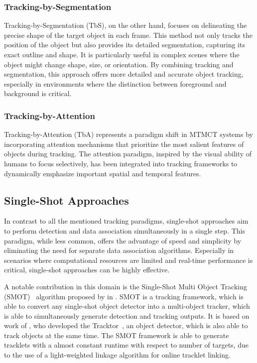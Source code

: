 \subsubsection{Tracking-by-Segmentation}\label{subsubsec:tracking-by-segmentation}
Tracking-by-Segmentation (TbS), on the other hand, focuses on delineating the precise shape of the target object in each frame. This method not only tracks the position of the object but also provides its detailed segmentation, capturing its exact outline and shape. It is particularly useful in complex scenes where the object might change shape, size, or orientation. By combining tracking and segmentation, this approach offers more detailed and accurate object tracking, especially in environments where the distinction between foreground and background is critical.

\subsubsection{Tracking-by-Attention}\label{subsubsec:tracking_by_attention}Tracking-by-Attention (TbA) represents a paradigm shift in MTMCT systems by incorporating attention mechanisms that prioritize the most salient features of objects during tracking. The attention paradigm, inspired by the visual ability of humans to focus selectively, has been integrated into tracking frameworks to dynamically emphasize important spatial and temporal features.

\subsection{Single-Shot Approaches}\label{subsec:single-shot_approaches}
In contrast to all the mentioned tracking paradigms, single-shot approaches aim to perform detection and data association simultaneously in a single step. This paradigm, while less common, offers the advantage of speed and simplicity by eliminating the need for separate data association algorithms. Especially in scenarios where computational resources are limited and real-time performance is critical, single-shot approaches can be highly effective.

A notable contribution in this domain is the Single-Shot Multi Object Tracking (SMOT)~\cite{Li20} algorithm proposed by \citeauthor{Li20} in \citeyear{Li20}. SMOT is a tracking framework, which is able to convert any single-shot object detector into a multi-object tracker, which is able to simultaneously generate detection and tracking outputs. It is based on work of \citeauthor{Bergmann19}, who developed the Tracktor~\cite{Bergmann19}, an object detector, which is also able to track objects at the same time. The SMOT framework is able to generate tracklets with a almost constant runtime with respect to number of targets, due to the use of a light-weighted linkage algorithm for online tracklet linking.

